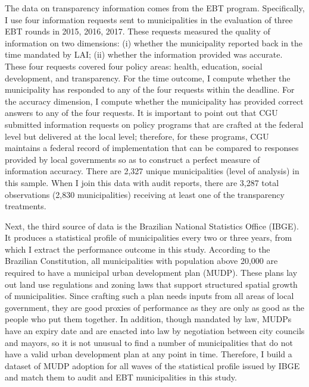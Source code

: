 \documentclass[11pt]{article}
\begin{document}
The data on transparency information comes from the EBT program. Specifically, I use four information requests sent to municipalities in the evaluation of three EBT rounds in 2015, 2016, 2017. These requests measured the quality of information on two dimensions: (i) whether the municipality reported back in the time mandated by LAI; (ii) whether the information provided was accurate. These four requests covered four policy areas: health, education, social development, and transparency. For the time outcome, I compute whether the municipality has responded to any of the four requests within the deadline. For the accuracy dimension, I compute whether the municipality has provided correct answers to any of the four requests. It is important to point out that CGU submitted information requests on policy programs that are crafted at the federal level but delivered at the local level; therefore, for these programs, CGU maintains a federal record of implementation that can be compared to responses provided by local governments so as to construct a perfect measure of information accuracy. There are 2,327 unique municipalities (level of analysis) in this sample. When I join this data with audit reports, there are 3,287 total observations (2,830 municipalities) receiving at least one of the transparency treatments.

Next, the third source of data is the Brazilian National Statistics Office (IBGE). It produces a statistical profile of municipalities every two or three years, from which I extract the performance outcome in this study. According to the Brazilian Constitution, all municipalities with population above 20,000 are required to have a municipal urban development plan (MUDP). These plans lay out land use regulations and zoning laws that support structured spatial growth of municipalities. Since crafting such a plan needs inputs from all areas of local government, they are good proxies of performance as they are only as good as the people who put them together. In addition, though mandated by law, MUDPs have an expiry date and are enacted into law by negotiation between city councils and mayors, so it is not unusual to find a number of municipalities that do not have a valid urban development plan at any point in time. Therefore, I build a dataset of MUDP adoption for all waves of the statistical profile issued by IBGE and match them to audit and EBT municipalities in this study.
\end{document}
